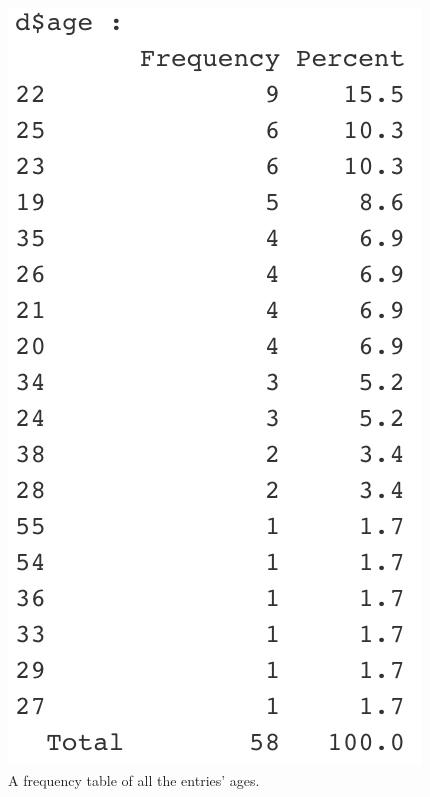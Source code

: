 \begin{figure}[!htb]
	\includegraphics[width=\linewidth]{../LaTeX/Figures/Environments/AgeFreq.png}
	\caption{A frequency table of all the entries' ages.}\label{fig:ageFreq}
	\endminipage\hfill
\end{figure}

